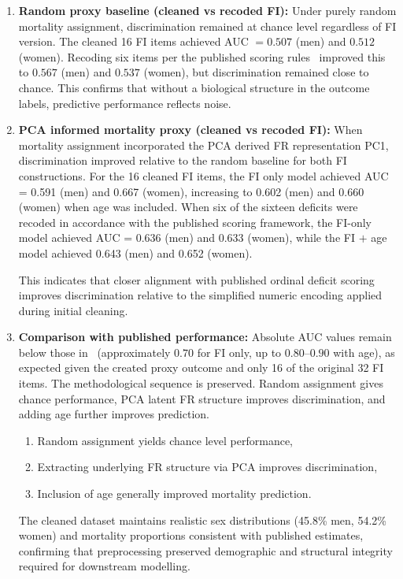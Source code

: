 \begin{enumerate}
\item \textbf{Random proxy baseline (cleaned vs recoded \gls{FI}):}  
Under purely random mortality assignment, discrimination remained at chance level regardless of \gls{FI} version. The cleaned 16 \gls{FI} items achieved \gls{AUC} $= 0.507$ (men) and $0.512$ (women). Recoding six items per the published scoring rules~\cite{moguilnerImportanceAgePrediction2021} improved this to $0.567$ (men) and $0.537$ (women), but discrimination remained close to chance. This confirms that without a biological structure in the outcome labels, predictive performance reflects noise.

\item \textbf{\gls{PCA} informed mortality proxy (cleaned vs recoded \gls{FI}):}  
When mortality assignment incorporated the \gls{PCA} derived \gls{FR} representation \gls{PC1}, discrimination improved relative to the random baseline for both \gls{FI} constructions. For the 16 cleaned \gls{FI} items, the \gls{FI} only model achieved \gls{AUC} = 0.591 (men) and 0.667 (women), increasing to 0.602 (men) and 0.660 (women) when age was included.
When six of the sixteen deficits were recoded in accordance with the published scoring framework, the \gls{FI}-only model achieved \gls{AUC} = 0.636 (men) and 0.633 (women), while the \gls{FI} $+$ age model achieved 0.643 (men) and 0.652 (women).

This indicates that closer alignment with published ordinal deficit scoring improves discrimination relative to the simplified numeric encoding applied during initial cleaning.
\item \textbf{Comparison with published performance:}  
Absolute \gls{AUC} values remain below those in~\cite{moguilnerImportanceAgePrediction2021} (approximately $0.70$ for \gls{FI} only, up to $0.80$--$0.90$ with age), as expected given the created proxy outcome and only 16 of the original 32 \gls{FI} items. The methodological sequence is preserved. Random assignment gives chance performance, \gls{PCA} latent \gls{FR} structure improves discrimination, and adding age further improves prediction.
\begin{enumerate}[label= (\roman*)]
\item Random assignment yields chance level performance, 
\item Extracting underlying \gls{FR} structure via \gls{PCA} improves discrimination, 
\item Inclusion of age generally improved mortality prediction. 
\end{enumerate}
The cleaned dataset maintains realistic sex distributions (45.8\% men, 54.2\% women) and mortality proportions consistent with published estimates, confirming that preprocessing preserved demographic and structural integrity required for downstream modelling.
\end{enumerate}

